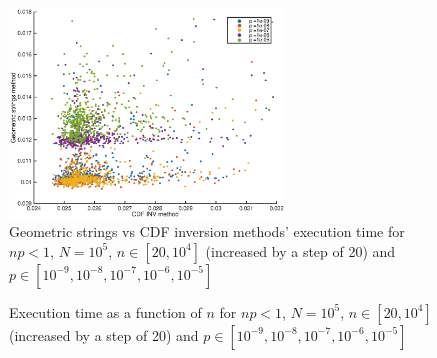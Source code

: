 \documentclass[10pt]{article}
\begin{document}
\begin{figure}[h]
  \centering
  \includegraphics[width = 0.65\textwidth]{images/bin_smallp}
  \caption{Geometric strings vs CDF inversion methods' execution time for $np < 1$, $N = 10^5$, $n\in [20, 10^4]$ (increased by a step of 20) and $p \in [10^{-9}, 10^{-8}, 10^{-7}, 10^{-6}, 10^{-5}]$}
  \label{fig:bin_small}
\end{figure}

\begin{figure}[h]
  \centering
  \caption{Execution time as a function of $n$ for $np < 1$, $N = 10^5$, $n\in [20, 10^4]$ (increased by a step of 20) and $p \in [10^{-9}, 10^{-8}, 10^{-7}, 10^{-6}, 10^{-5}]$}
  \label{fig:npn}
\end{figure}

\clearpage
\end{document}
